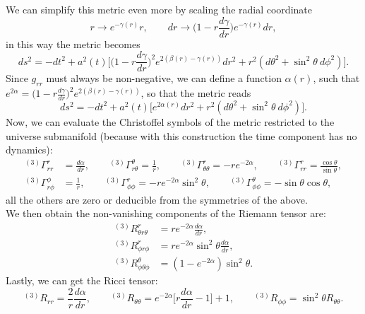 We can simplify this metric even more by scaling the radial coordinate
\begin{equation*}
    r\rightarrow e^{-\gamma(r)}r,\qquad dr\rightarrow \bigg(1-r\frac{d\gamma}{dr}\bigg)e^{-\gamma(r)}dr,
\end{equation*}
in this way the metric becomes
\begin{equation*}
    ds^2=-dt^2+a^2(t)\bigg[\bigg(1-r\frac{d\gamma}{dr}\bigg)^{2}e^{2(\beta(r)-\gamma(r))}dr^2+r^2(d\theta^2+\sin^2\theta\ d\phi^2)\bigg].
\end{equation*}
Since $g_{rr}$ must always be non-negative, we can define a function $\alpha(r)$, such that $e^{2\alpha}=\big(1-r\frac{d\gamma}{dr}\big)^{2}e^{2(\beta(r)-\gamma(r))}$, so that the metric reads
\begin{equation*}
    ds^2=-dt^2+a^2(t)\big[e^{2\alpha(r)}dr^2+r^2(d\theta^2+\sin^2\theta\ d\phi^2)\big].
\end{equation*}
Now, we can evaluate the Christoffel symbols of the metric restricted to the universe submanifold (because with this construction the time component has no dynamics):
\begin{align}\label{eq:RWL3Christoffel}
    ^{(3)}\Gamma_{rr}^r&=\frac{d\alpha}{dr},\qquad^{(3)}\Gamma_{r\theta}^\theta=\frac{1}{r},\qquad^{(3)}\Gamma_{\theta\theta}^r=-re^{-2\alpha},\qquad^{(3)}\Gamma_{rr}^r=\frac{\cos\theta}{\sin\theta},\nonumber\\
    ^{(3)}\Gamma_{r\phi}^\phi&=\frac{1}{r},\qquad^{(3)}\Gamma_{\phi\phi}^r=-re^{-2\alpha}\sin^2\theta,\qquad^{(3)}\Gamma_{\phi\phi}^\theta=-\sin\theta\cos\theta,
\end{align}
all the others are zero or deducible from the symmetries of the above.\\ We then obtain the non-vanishing components of the Riemann tensor are:
\begin{align}\label{eq:RWL3Riemann}
    ^{(3)}R^r_{\theta r\theta}&=re^{-2\alpha}\frac{d\alpha}{dr},\nonumber\\
    ^{(3)}R^r_{\phi r\phi}&=re^{-2\alpha}\sin^2\theta\frac{d\alpha}{dr},\nonumber\\
    ^{(3)}R^\theta_{\phi \theta\phi}&=(1-e^{-2\alpha})\sin^2\theta.
\end{align}
Lastly, we can get the Ricci tensor:
\begin{equation}\label{eq:RWL3Ricci}
    ^{(3)}R_{rr}=\frac{2}{r}\frac{d\alpha}{dr},\qquad ^{(3)}R_{\theta\theta}=e^{-2\alpha}\bigg[r\frac{d\alpha}{dr}-1\bigg]+1,\qquad ^{(3)}R_{\phi\phi}=\sin^2\theta R_{\theta\theta}.
\end{equation}
